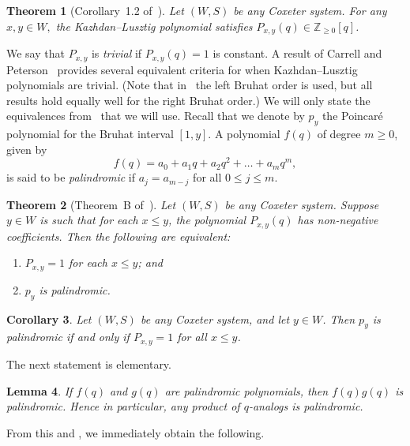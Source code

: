\documentclass[11pt]{amsart}
\theoremstyle{plain}
\newtheorem{thm}{Theorem}[section]
\newtheorem{lemma}[thm]{Lemma}
\newtheorem{corollary}[thm]{Corollary}
\theoremstyle{definition}
\newcommand{\Z}{\mathbb{Z}}
\newcommand{\Pxy}{P_{x,y}} %
\numberwithin{equation}{subsection}
\begin{document}
\begin{thm}[Corollary~1.2 of~\cite{EliasWilliamson}] \label{thm:EW}
Let $(W,S)$ be any Coxeter system.  For any $x, y \in W,$ the Kazhdan--Lusztig polynomial satisfies $P_{x,y}(q) \in \Z_{\geq 0}[q]$.
\end{thm}

We say that $\Pxy$ is \emph{trivial} if $\Pxy(q) = 1$ is constant. A result of Carrell and Peterson~\cite{Carrell} provides several equivalent criteria for when Kazhdan--Lusztig polynomials are trivial.  (Note that in~\cite{Carrell} the left Bruhat order is used, but all results hold equally well for the right Bruhat order.) We will only state the equivalences from~\cite{Carrell} that we will use.  Recall that we denote by $p_y$ the Poincar\'e polynomial for the Bruhat interval $[1,y]$. %
A polynomial $f(q)$ of degree $m \geq 0$, given by
\[
	f(q) = a_0 + a_1 q + a_2 q^2 + \dots + a_m q^m,
\]
is said to be \emph{palindromic} if $a_j = a_{m-j}$ for all $0 \leq j \leq m$.


\begin{thm}[Theorem~B of~\cite{Carrell}]\label{thm:palindromic-iff-trivial}
	Let $(W,S)$ be any Coxeter system. Suppose $y \in W$ is such that for each $x \leq y$, the polynomial $\Pxy(q)$ has non-negative coefficients.
	Then the following are equivalent:
	\begin{enumerate}
		\item $\Pxy = 1$ for each $x \leq y$; and
		\item $p_y$ is palindromic.
	\end{enumerate}
\end{thm}




\begin{corollary}\label{cor:palindromic} 
Let $(W,S)$ be any Coxeter system, and let $y \in W$. Then $p_y$ is palindromic if and only if $\Pxy = 1$ for all $x \leq y$.
\end{corollary}

The next statement is elementary.

\begin{lemma}\label{lem:palindromic-closed-under-mult} 
	If $f(q)$ and $g(q)$ are palindromic polynomials, then $f(q)g(q)$ is palindromic. Hence in particular, any product of $q$-analogs is palindromic.
\end{lemma}

From this and , we immediately obtain the following.
\end{document}
